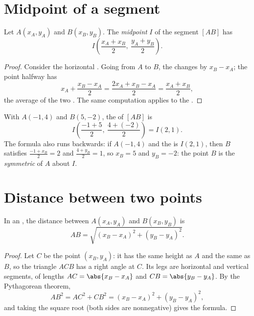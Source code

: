 \section{Midpoint of a segment}

\begin{proposition}\label{prop:g10:coordgeom:midpoint}
Let $A(x_A, y_A)$ and $B(x_B, y_B)$. The \emph{midpoint}
$I$ of the segment $[AB]$ has 
\[
I\left(\frac{x_A + x_B}{2},\ \frac{y_A + y_B}{2}\right).
\]
\end{proposition}

\begin{proof}
Consider the horizontal . Going from $A$ to $B$, the 
changes by $x_B - x_A$; the point halfway has 
\[
x_A + \frac{x_B - x_A}{2} = \frac{2x_A + x_B - x_A}{2}
= \frac{x_A + x_B}{2},
\]
the average of the two . The same computation applies to the
.
\end{proof}

\begin{example}\label{ex:g10:coordgeom:midpoint}
With $A(-1, 4)$ and $B(5, -2)$, the  of $[AB]$ is
\[
I\left(\frac{-1 + 5}{2},\ \frac{4 + (-2)}{2}\right) = I(2, 1).
\]
The formula also runs backwards: if $A(-1, 4)$ and the  is
$I(2, 1)$, then $B$ satisfies $\frac{-1 + x_B}{2} = 2$ and
$\frac{4 + y_B}{2} = 1$, so $x_B = 5$ and $y_B = -2$: the point $B$ is the
\emph{symmetric} of $A$ about $I$.
\end{example}

\section{Distance between two points}

\begin{theorem}\label{thm:g10:coordgeom:distance}
In an , the distance between $A(x_A, y_A)$ and
$B(x_B, y_B)$ is
\[
AB = \sqrt{(x_B - x_A)^2 + (y_B - y_A)^2}.
\]
\end{theorem}

\begin{proof}
Let $C$ be the point $(x_B, y_A)$: it has the same height as $A$ and the
same  as $B$, so the triangle $ACB$ has a right angle at $C$. Its
legs are horizontal and vertical segments, of lengths
$AC = \abs{x_B - x_A}$ and $CB = \abs{y_B - y_A}$. By the Pythagorean
theorem,
\[
AB^2 = AC^2 + CB^2 = (x_B - x_A)^2 + (y_B - y_A)^2,
\]
and taking the square root (both sides are nonnegative) gives the formula.
\end{proof}

